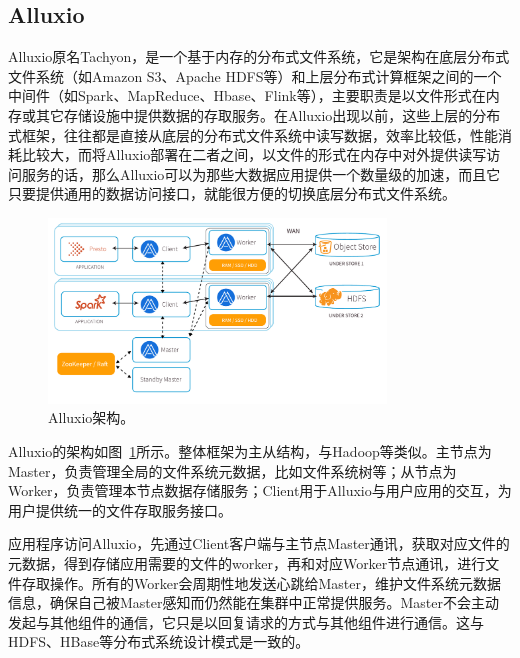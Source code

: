 \subsection{Alluxio}
\label{subsec:alluxio}

\par Alluxio原名Tachyon，是一个基于内存的分布式文件系统，它是架构在底层分布式文件系统（如Amazon S3、Apache HDFS等）和上层分布式计算框架之间的一个中间件（如Spark、MapReduce、Hbase、Flink等），主要职责是以文件形式在内存或其它存储设施中提供数据的存取服务。在Alluxio出现以前，这些上层的分布式框架，往往都是直接从底层的分布式文件系统中读写数据，效率比较低，性能消耗比较大，而将Alluxio部署在二者之间，以文件的形式在内存中对外提供读写访问服务的话，那么Alluxio可以为那些大数据应用提供一个数量级的加速，而且它只要提供通用的数据访问接口，就能很方便的切换底层分布式文件系统。

\begin{figure}[]
	\centering
	\includegraphics[width=0.8\textwidth]{img/simple-solution/alluxio-archi}
	
	\caption{Alluxio架构。}
	\label{fig:alluxio-archi}
\end{figure}

\par Alluxio的架构如图~\ref{fig:alluxio-archi}所示。整体框架为主从结构，与Hadoop\cite{hdfs}等类似。主节点为Master，负责管理全局的文件系统元数据，比如文件系统树等；从节点为Worker，负责管理本节点数据存储服务；Client用于Alluxio与用户应用的交互，为用户提供统一的文件存取服务接口。

\par 应用程序访问Alluxio，先通过Client客户端与主节点Master通讯，获取对应文件的元数据，得到存储应用需要的文件的worker，再和对应Worker节点通讯，进行文件存取操作。所有的Worker会周期性地发送心跳给Master，维护文件系统元数据信息，确保自己被Master感知而仍然能在集群中正常提供服务。Master不会主动发起与其他组件的通信，它只是以回复请求的方式与其他组件进行通信。这与HDFS、HBase等分布式系统设计模式是一致的。

